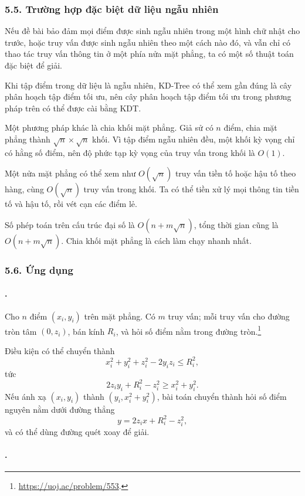 \documentclass[11pt]{article}
\begin{document}
\subsubsection*{5.5. Trường hợp đặc biệt dữ liệu ngẫu nhiên}

Nếu đề bài bảo đảm mọi điểm được sinh ngẫu nhiên trong một hình chữ nhật cho
trước, hoặc truy vấn được sinh ngẫu nhiên theo một cách nào đó, và vẫn chỉ có
thao tác truy vấn thông tin ở một phía nửa mặt phẳng, ta có một số thuật toán
đặc biệt để giải.

Khi tập điểm trong dữ liệu là ngẫu nhiên, KD-Tree có thể xem gần đúng là cây
phân hoạch tập điểm tối ưu, nên cây phân hoạch tập điểm tối ưu trong phương
pháp trên có thể được cài bằng KDT.

Một phương pháp khác là chia khối mặt phẳng. Giả sử có \(n\) điểm, chia mặt
phẳng thành \(\sqrt n\times\sqrt n\) khối. Vì tập điểm ngẫu nhiên đều, một khối
kỳ vọng chỉ có hằng số điểm, nên độ phức tạp kỳ vọng của truy vấn trong khối là
\(O(1)\).

Một nửa mặt phẳng có thể xem như \(O(\sqrt n)\) truy vấn tiền tố hoặc hậu tố
theo hàng, cùng \(O(\sqrt n)\) truy vấn trong khối. Ta có thể tiền xử lý mọi
thông tin tiền tố và hậu tố, rồi vét cạn các điểm lẻ.

Số phép toán trên cấu trúc đại số là \(O(n+m\sqrt n)\), tổng thời gian cũng là
\(O(n+m\sqrt n)\). Chia khối mặt phẳng là cách làm chạy nhanh nhất.

\subsubsection*{5.6. Ứng dụng}

\paragraph{.}

Cho \(n\) điểm \((x_i,y_i)\) trên mặt phẳng. Có \(m\) truy vấn; mỗi truy vấn
cho đường tròn tâm \((0,z_i)\), bán kính \(R_i\), và hỏi số điểm nằm trong
đường tròn.\footnote{\url{https://uoj.ac/problem/553}.}

Điều kiện có thể chuyển thành
\[
  x_i^2+y_i^2+z_i^2-2y_iz_i\le R_i^2,
\]
tức
\[
  2z_iy_i+R_i^2-z_i^2\ge x_i^2+y_i^2.
\]
Nếu ánh xạ \((x_i,y_i)\) thành \((y_i,x_i^2+y_i^2)\), bài toán chuyển thành
hỏi số điểm nguyên nằm dưới đường thẳng
\[
  y=2z_i x+R_i^2-z_i^2,
\]
và có thể dùng đường quét xoay để giải.

\paragraph{.}
\end{document}
